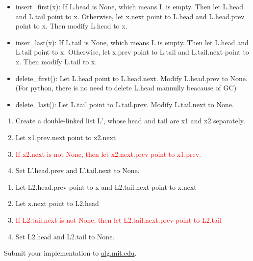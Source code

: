 \documentclass[12pt,twoside]{article}
\begin{document}
\begin{problems}
\begin{problemparts}
\problempart %
\begin{itemize}
    \item insert\_first(x): 
    If L.head is None, which means L is empty. 
    Then let L.head and L.tail point to x.
    Otherwise, let x.next point to L.head and L.head.prev point to x.
    Then modify L.head to x.
    \item inser\_last(x): 
    If L.tail is None, which means L is empty.
    Then let L.head and L.tail point to x.
    Otherwise, let x.prev point to L.tail and L.tail.next point to x.
    Then modify L.tail to x.
    \item delete\_first(): 
    Let L.head point to L.head.next. Modify L.head.prev to None.
    (For python, there is no need to delete L.head mannully beacause of GC)
    \item delete\_last(): 
    Let L.tail point to L.tail.prev. Modify L.tail.next to None. 
\end{itemize}
\problempart %
\begin{enumerate}
    \item Create a double-linked list L', whose head and tail are x1 and x2 separately.
    \item Let x1.prev.next point to x2.next
    \item \textcolor{red}{If x2.next is not None, then let x2.next.prev point to x1.prev.}
    \item Set L'.head.prev and L'.tail.next to None.
\end{enumerate}
\problempart %
\begin{enumerate}
    \item Let L2.head.prev point to x and L2.tail.next point to x.next
    \item Let x.next point to L2.head
    \item \textcolor{red}{If L2.tail.next is not None, then let L2.tail.next.prev point to L2.tail}
    \item Set L2.head and L2.tail to None.
\end{enumerate}
\problempart Submit your implementation to {\small\url{alg.mit.edu}}.
\end{problemparts}

\end{problems}
\end{document}
